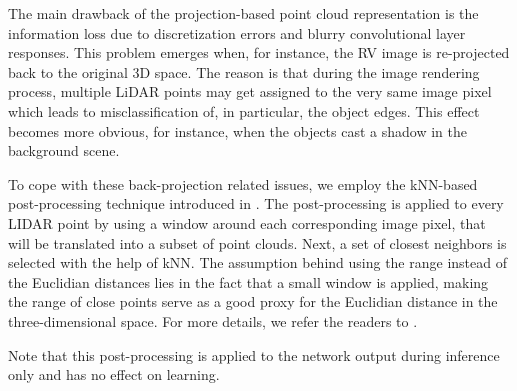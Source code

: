 \documentclass[letterpaper, 10 pt, conference]{ieeeconf}
\begin{document}
The main drawback of the projection-based point cloud representation  is the information loss   
due to discretization errors and blurry convolutional layer responses. 
This problem emerges when, for instance, the RV image  is re-projected back to the original 3D space. The reason is that during the image rendering process, multiple LiDAR points may get assigned to the very same image pixel which leads to misclassification of, in particular,   the object edges.  This effect becomes more obvious, for instance, when the objects cast a shadow in the background scene. 

To cope with these back-projection related issues, we employ the kNN-based post-processing technique introduced in \cite{rangenetpp}. 
The post-processing is applied to every LIDAR point by using a window around each corresponding image pixel, that will be translated into a subset of point clouds. Next, a set of closest neighbors is selected with the help of kNN. 
The assumption behind using the range instead of the Euclidian distances lies in the fact that a small window is applied, making the range of close  points serve as a good proxy for the Euclidian distance in the three-dimensional space.
For more details, we refer the readers to \cite{rangenetpp}.

Note that this post-processing is applied to the network output during inference only and has no effect on   learning. 
\end{document}
